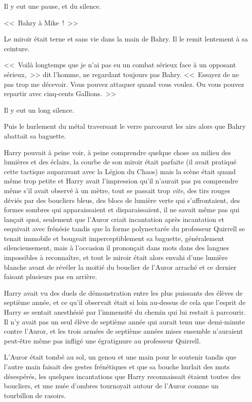 Il y eut une pause, et du silence.

<<~Bahry à Mike~!~>>

Le miroir était terne et sans vie dans la main de Bahry. Il le remit lentement à sa ceinture.

<<~Voilà longtemps que je n'ai pas eu un combat sérieux face à un opposant sérieux,~>> dit l'homme, ne regardant toujours pas Bahry. <<~Essayez de ne pas trop me décevoir. Vous pouvez attaquer quand vous voulez. Ou vous pouvez repartir avec cinq-cents Gallions.~>>

Il y eut un long silence.

Puis le hurlement du métal traversant le verre parcourut les airs alors que Bahry abattait sa baguette.

\later

Harry pouvait à peine voir, à peine comprendre quelque chose au milieu des lumières et des éclairs, la courbe de son miroir était parfaite (il avait pratiqué cette tactique auparavant avec la Légion du Chaos) mais la scène était quand même trop petite et Harry avait l'impression qu'il n'aurait pas pu comprendre même s'il avait observé à un mètre, tout se passait trop \emph{vite}, des tirs rouges déviés par des boucliers bleus, des blocs de lumière verte qui s'affrontaient, des formes sombres qui apparaissaient et disparaissaient, il ne savait même pas qui lançait quoi, seulement que l'Auror criait incantation après incantation et esquivait avec frénésie tandis que la forme polynectarée du professeur Quirrell se tenait immobile et bougeait imperceptiblement sa baguette, généralement silencieusement, mais à l'occasion il prononçait dans mots dans des langues impossibles à reconnaître, et tout le miroir était alors envahi d'une lumière blanche avant de révéler la moitié du bouclier de l'Auror arraché et ce dernier faisant plusieurs pas en arrière.

Harry avait vu des duels de démonstration entre les plus puissants des élèves de septième année, et ce qu'il observait était si loin au-dessus de cela que l'esprit de Harry se sentait anesthésié par l'immensité du chemin qui lui restait à parcourir. Il n'y avait pas un seul élève de septième année qui aurait tenu une demi-minute contre l'Auror, et les trois armées de septième années mises ensemble n'auraient peut-être même pas infligé une égratignure au professeur Quirrell.

L'Auror était tombé au sol, un genou et une main pour le soutenir tandis que l'autre main faisait des gestes frénétiques et que sa bouche hurlait des mots désespérés, les quelques incantations que Harry reconnaissait étaient toutes des boucliers, et une nuée d'ombres tournoyait autour de l'Auror comme un tourbillon de rasoirs.

